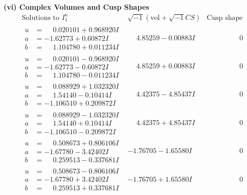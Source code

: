 \documentclass[1p]{elsarticle_modified}
\theoremstyle{definition}
\newcommand{\I}{\sqrt{-1}}
\begin{document}
\newpage\flushleft \textbf{(vi) Complex Volumes and Cusp Shapes}
$$\begin{array}{c|c|c}  
\text{Solutions to }I^u_{1}& \I (\text{vol} + \sqrt{-1}CS) & \text{Cusp shape}\\
 \hline 
\begin{aligned}
u &= \phantom{-}0.020101 + 0.968920 I \\
a &= -1.62773 + 0.60872 I \\
b &= \phantom{-}1.104780 + 0.011234 I\end{aligned}
 & \phantom{-}4.85259 - 0.00883 I & \phantom{-0.000000 } 0 \\ \hline\begin{aligned}
u &= \phantom{-}0.020101 - 0.968920 I \\
a &= -1.62773 - 0.60872 I \\
b &= \phantom{-}1.104780 - 0.011234 I\end{aligned}
 & \phantom{-}4.85259 + 0.00883 I & \phantom{-0.000000 } 0 \\ \hline\begin{aligned}
u &= \phantom{-}0.088929 + 1.032320 I \\
a &= \phantom{-}1.54140 - 0.10414 I \\
b &= -1.106510 + 0.209872 I\end{aligned}
 & \phantom{-}4.42375 - 4.85437 I & \phantom{-0.000000 } 0 \\ \hline\begin{aligned}
u &= \phantom{-}0.088929 - 1.032320 I \\
a &= \phantom{-}1.54140 + 0.10414 I \\
b &= -1.106510 - 0.209872 I\end{aligned}
 & \phantom{-}4.42375 + 4.85437 I & \phantom{-0.000000 } 0 \\ \hline\begin{aligned}
u &= \phantom{-}0.508673 + 0.806106 I \\
a &= -1.67780 - 3.42402 I \\
b &= \phantom{-}0.259513 - 0.337681 I\end{aligned}
 & -1.76705 - 1.65580 I & \phantom{-0.000000 } 0 \\ \hline\begin{aligned}
u &= \phantom{-}0.508673 - 0.806106 I \\
a &= -1.67780 + 3.42402 I \\
b &= \phantom{-}0.259513 + 0.337681 I\end{aligned}
 & -1.76705 + 1.65580 I & \phantom{-0.000000 } 0 \\ \hline\begin{aligned}

\end{aligned}
\end{array}$$
\end{document}
